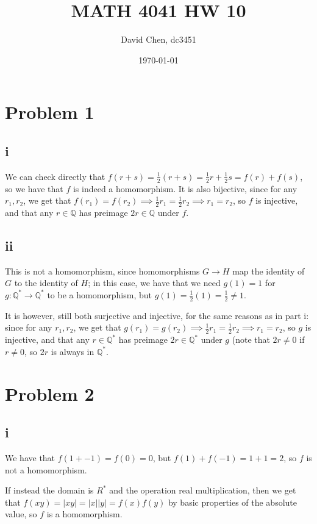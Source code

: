 \documentclass[12pt,letterpaper]{article}
\title{MATH 4041 HW 10}
\author{David Chen, dc3451}
\date{\today}
\theoremstyle{definition}
\newcommand{\Q}{\mathbb{Q}}
\begin{document}
\maketitle

\section*{Problem 1}

\subsection*{i}

We can check directly that $f(r + s) = \frac{1}{2}(r + s) = \frac{1}{2}r + \frac{1}{2}s = f(r) + f(s)$, so we have that $f$ is indeed a homomorphism. It is also bijective, since for any $r_1, r_2$, we get that $f(r_1) = f(r_2) \implies \frac{1}{2}r_1 = \frac{1}{2}r_2 \implies r_1 = r_2$, so $f$ is injective, and that any $r \in \Q$ has preimage $2r \in \Q$ under $f$.

\subsection*{ii}

This is not a homomorphism, since homomorphisms $G \rightarrow H$ map the identity of $G$ to the identity of $H$; in this case, we have that we need $g(1) = 1$ for $g: \Q^* \rightarrow \Q^*$ to be a homomorphism, but $g(1) = \frac{1}{2}(1) = \frac{1}{2} \neq 1$.

It is however, still both surjective and injective, for the same reasons as in part i: since for any $r_1, r_2$, we get that $g(r_1) = g(r_2) \implies \frac{1}{2}r_1 = \frac{1}{2}r_2 \implies r_1 = r_2$, so $g$ is injective, and that any $r \in \Q^*$ has preimage $2r \in \Q^*$ under $g$ (note that $2r \neq 0$ if $r \neq 0$, so $2r$ is always in $\Q^*$.

\section*{Problem 2}

\subsection*{i}

We have that $f(1 + -1) = f(0) = 0$, but $f(1) + f(-1) = 1 + 1 = 2$, so $f$ is not a homomorphism.

If instead the domain is $R^*$ and the operation real multiplication, then we get that $f(xy) = |xy| = |x||y| = f(x)f(y)$ by basic properties of the absolute value, so $f$ is a homomorphism.
\end{document}
